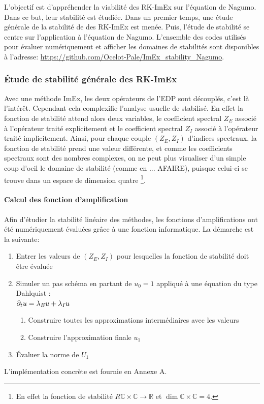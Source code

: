 L'objectif est d'appréhender la viabilité des RK-ImEx sur l'équation de Nagumo. Dans ce but, leur stabilité est étudiée.
Dans un premier temps, une étude générale de la stabilité de des RK-ImEx est menée.
Puis, l'étude de stabilité se centre sur l'application à l'équation de Nagumo. L'ensemble des codes utilisés pour évaluer numériquement et afficher les domaines de stabilités
sont disponibles à l'adresse: \href{https://github.com/Ocelot-Pale/ImEx_stability_Nagumo}{https://github.com/Ocelot-Pale/ImEx\_stability\_Nagumo}.



\subsubsection{Étude de stabilité générale des RK-ImEx}
    Avec une méthode ImEx, les deux opérateurs de l'EDP sont découplés, c'est là l'intérêt.
    Cependant cela complexifie l'analyse usuelle de stabilisé. 
    En effet la fonction de stabilité attend alors deux variables, %
    le coefficient spectral $Z_E$ associé à l'opérateur traité explicitement et
     le coefficient spectral $Z_I$ associé à l'opérateur traité implicitement.
    Ainsi, pour chaque couple $(Z_E,Z_I)$ d'indices spectraux, la fonction de stabilité prend une valeur différente, et comme les coefficients spectraux sont des nombres complexes, 
    on ne peut plus visualiser d'un simple coup d'oeil le domaine de stabilité (comme en ... AFAIRE), puisque celui-ci se trouve dans un espace de dimension quatre
    \footnote{En effet la fonction de stabilité $R \mathbb C \times \mathbb C \rightarrow \mathbb R$ et $\dim  \mathbb C \times \mathbb C=4$.}.
    \paragraph{Calcul des fonction d'amplification }
    Afin d'étudier la stabilité linéaire des méthodes, les fonctions d'amplifications ont été numériquement évaluées grâce à une fonction informatique. 
    La démarche est la suivante:
    \begin{enumerate}
        \item Entrer les valeurs de $(Z_E,Z_I)$ pour lesquelles la fonction de stabilité doit être évaluée
        \item Simuler un pas schéma en partant de $u_0 = 1$ appliqué à une équation du type Dahlquist :\\$\partial_t u = \lambda_E u + \lambda_I u$
        \begin{enumerate}
            \item Construire toutes les approximations intermédiaires avec les valeurs 
            \item Construire l'approximation finale $u_1$
        \end{enumerate}
        \item Évaluer la norme de $U_1$
    \end{enumerate}
    L'implémentation concrète est fournie en Annexe A.


